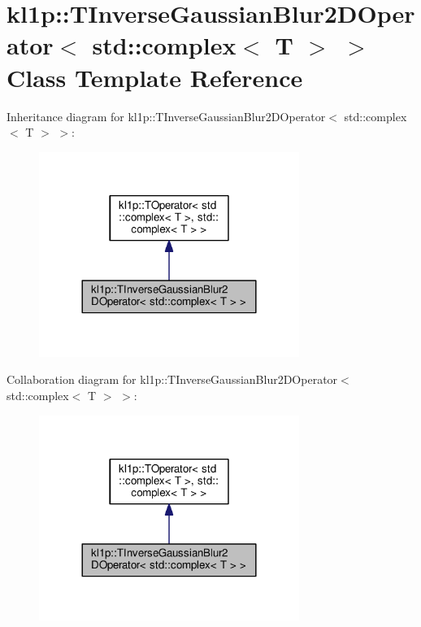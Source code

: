 \hypertarget{classkl1p_1_1TInverseGaussianBlur2DOperator_3_01std_1_1complex_3_01T_01_4_01_4}{}\section{kl1p\+:\+:T\+Inverse\+Gaussian\+Blur2\+D\+Operator$<$ std\+:\+:complex$<$ T $>$ $>$ Class Template Reference}
\label{classkl1p_1_1TInverseGaussianBlur2DOperator_3_01std_1_1complex_3_01T_01_4_01_4}


Inheritance diagram for kl1p\+:\+:T\+Inverse\+Gaussian\+Blur2\+D\+Operator$<$ std\+:\+:complex$<$ T $>$ $>$\+:
\nopagebreak
\begin{figure}[H]
\begin{center}
\leavevmode
\includegraphics[width=240pt]{classkl1p_1_1TInverseGaussianBlur2DOperator_3_01std_1_1complex_3_01T_01_4_01_4__inherit__graph}
\end{center}
\end{figure}


Collaboration diagram for kl1p\+:\+:T\+Inverse\+Gaussian\+Blur2\+D\+Operator$<$ std\+:\+:complex$<$ T $>$ $>$\+:
\nopagebreak
\begin{figure}[H]
\begin{center}
\leavevmode
\includegraphics[width=240pt]{classkl1p_1_1TInverseGaussianBlur2DOperator_3_01std_1_1complex_3_01T_01_4_01_4__coll__graph}
\end{center}
\end{figure}
